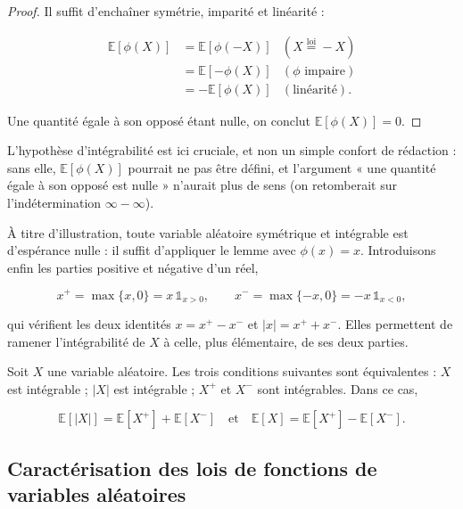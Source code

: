 \begin{proof}
Il suffit d'enchaîner symétrie, imparité et linéarité :

\begin{align*}
\mathbb{E}[\phi(X)] &= \mathbb{E}[\phi(-X)] & (X \overset{\text{loi}}{=} -X) \\
&= \mathbb{E}[-\phi(X)] & (\phi \text{ impaire}) \\
&= -\mathbb{E}[\phi(X)] & (\text{linéarité}).
\end{align*}

Une quantité égale à son opposé étant nulle, on conclut $\mathbb{E}[\phi(X)] = 0$.
\end{proof}

L'hypothèse d'intégrabilité est ici cruciale, et non un simple confort de rédaction : sans elle, $\mathbb{E}[\phi(X)]$ pourrait ne pas être défini, et l'argument « une quantité égale à son opposé est nulle » n'aurait plus de sens (on retomberait sur l'indétermination $\infty - \infty$).

À titre d'illustration, toute variable aléatoire symétrique et intégrable est d'espérance nulle : il suffit d'appliquer le lemme avec $\phi(x) = x$. Introduisons enfin les parties positive et négative d'un réel,

$$
x^+ = \max\{x, 0\} = x\, \mathbb{1}_{x > 0}, \qquad x^- = \max\{-x, 0\} = -x\, \mathbb{1}_{x < 0},
$$

qui vérifient les deux identités $x = x^+ - x^-$ et $|x| = x^+ + x^-$. Elles permettent de ramener l'intégrabilité de $X$ à celle, plus élémentaire, de ses deux parties.

\medskip

\begin{mdframed}
\begin{lemme}
Soit $X$ une variable aléatoire. Les trois conditions suivantes sont équivalentes : $X$ est intégrable ; $|X|$ est intégrable ; $X^+$ et $X^-$ sont intégrables. Dans ce cas,

$$
\mathbb{E}[|X|] = \mathbb{E}[X^+] + \mathbb{E}[X^-] \quad \text{et} \quad \mathbb{E}[X] = \mathbb{E}[X^+] - \mathbb{E}[X^-].
$$
\end{lemme}
\end{mdframed}

\subsection{Caractérisation des lois de fonctions de variables aléatoires}

